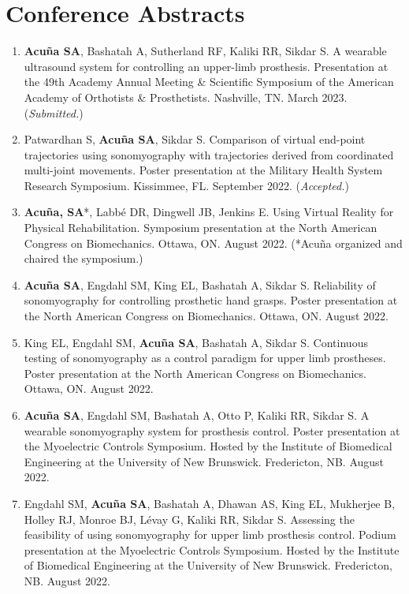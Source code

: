 \documentclass[letterpaper, 10pt]{article}
\begin{document}
\section{Conference Abstracts}
\begin{enumerate}
    \item \textbf{Acuña SA}, Bashatah A, Sutherland RF, Kaliki RR, Sikdar S. A wearable ultrasound system for controlling an upper-limb prosthesis. Presentation at the 49th Academy Annual Meeting \& Scientiﬁc Symposium of the American Academy of Orthotists \& Prosthetists. Nashville, TN. March 2023. (\textit{Submitted.})
    \item Patwardhan S, \textbf{Acuña SA}, Sikdar S. Comparison of virtual end-point trajectories using sonomyography with trajectories derived from coordinated multi-joint movements. Poster presentation at the Military Health System Research Symposium. Kissimmee, FL. September 2022. (\textit{Accepted.})
    \item \textbf{Acuña, SA}*, Labbé DR, Dingwell JB, Jenkins E. Using Virtual Reality for Physical Rehabilitation. Symposium presentation at the North American Congress on Biomechanics. Ottawa, ON. August 2022. (*Acuña organized and chaired the symposium.)
    \item \textbf{Acuña SA}, Engdahl SM, King EL, Bashatah A, Sikdar S. Reliability of sonomyography for controlling prosthetic hand grasps. Poster presentation at the North American Congress on Biomechanics. Ottawa, ON. August 2022.
    \item King EL, Engdahl SM, \textbf{Acuña SA}, Bashatah A, Sikdar S. Continuous testing of sonomyography as a control paradigm for upper limb prostheses. Poster presentation at the North American Congress on Biomechanics. Ottawa, ON. August 2022.
    \item \textbf{Acuña SA}, Engdahl SM, Bashatah A, Otto P, Kaliki RR, Sikdar S. A wearable sonomyography system for prosthesis control. Poster presentation at the Myoelectric Controls Symposium. Hosted by the Institute of Biomedical Engineering at the University of New Brunswick. Fredericton, NB. August 2022.
    \item Engdahl SM, \textbf{Acuña SA}, Bashatah A, Dhawan AS, King EL, Mukherjee B, Holley RJ, Monroe BJ, Lévay G, Kaliki RR, Sikdar S. Assessing the feasibility of using sonomyography for upper limb prosthesis control. Podium presentation at the Myoelectric Controls Symposium. Hosted by the Institute of Biomedical Engineering at the University of New Brunswick. Fredericton, NB. August 2022.

\end{enumerate}
\end{document}
